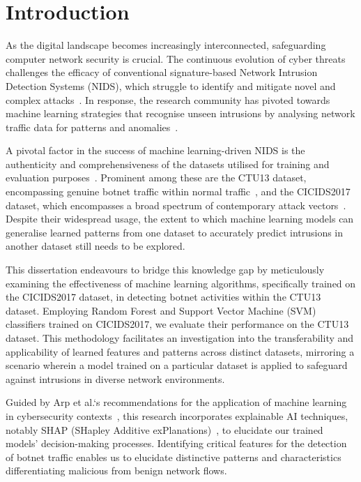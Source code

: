\chapter{Introduction}\label{chap:introduction}

As the digital landscape becomes increasingly interconnected, safeguarding computer network security is crucial. The continuous evolution of cyber threats challenges the efficacy of conventional signature-based Network Intrusion Detection Systems (NIDS), which struggle to identify and mitigate novel and complex attacks~\cite{marchetti2016analysis}. In response, the research community has pivoted towards machine learning strategies that recognise unseen intrusions by analysing network traffic data for patterns and anomalies~\cite{buczak2015survey}.

A pivotal factor in the success of machine learning-driven NIDS is the authenticity and comprehensiveness of the datasets utilised for training and evaluation purposes~\cite{engelen2021troubleshooting}. Prominent among these are the CTU13 dataset, encompassing genuine botnet traffic within normal traffic~\cite{garcia2014empirical}, and the CICIDS2017 dataset, which encompasses a broad spectrum of contemporary attack vectors~\cite{sharafaldin2018toward}. Despite their widespread usage, the extent to which machine learning models can generalise learned patterns from one dataset to accurately predict intrusions in another dataset still needs to be explored.

This dissertation endeavours to bridge this knowledge gap by meticulously examining the effectiveness of machine learning algorithms, specifically trained on the CICIDS2017 dataset, in detecting botnet activities within the CTU13 dataset. Employing Random Forest and Support Vector Machine (SVM) classifiers trained on CICIDS2017, we evaluate their performance on the CTU13 dataset. This methodology facilitates an investigation into the transferability and applicability of learned features and patterns across distinct datasets, mirroring a scenario wherein a model trained on a particular dataset is applied to safeguard against intrusions in diverse network environments.

Guided by Arp et al.`s recommendations for the application of machine learning in cybersecurity contexts~\cite{arp2022and}, this research incorporates explainable AI techniques, notably SHAP (SHapley Additive exPlanations)~\cite{lundberg2017unified}, to elucidate our trained models' decision-making processes. Identifying critical features for the detection of botnet traffic enables us to elucidate distinctive patterns and characteristics differentiating malicious from benign network flows.

